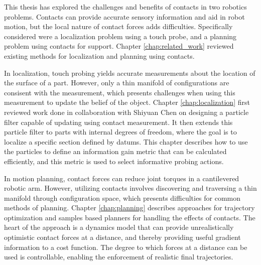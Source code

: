 \documentclass[../thesis.tex]{subfiles}
\begin{document}

This thesis has explored the challenges and benefits of contacts in two robotics problems.
Contacts can provide accurate sensory information and aid in robot motion, but the local nature of contact forces adds difficulties.
Specifically considered were a localization problem using a touch probe, and a planning problem using contacts for support.
Chapter \ref{chap:related_work} reviewed existing methods for localization and planning using contacts.

In localization, touch probing yields accurate measurements about the location of the surface of a part.
However, only a thin manifold of configurations are consisent with the measurement, which presents challenges when using this measurement to update the belief of the object.
Chapter \ref{chap:localization} first reviewed work done in collaboration with Shiyuan Chen \cite{Saund2017} on designing a particle filter capable of updating using contact measurement.
It then extends this particle filter to parts with internal degrees of freedom, where the goal is to localize a specific section defined by datums.
This chapter describes how to use the particles to define an information gain metric that can be calculated efficiently, and this metric is used to select informative probing actions.

In motion planning, contact forces can reduce joint torques in a cantilevered robotic arm.
However, utilizing contacts involves discovering and traversing a thin manifold through configuration space, which presents difficulties for common methods of planning.
Chapter \ref{chap:planning} describes approaches for trajectory optimization and samples based planners for handling the effects of contacts.
The heart of the approach is a dynamics model that can provide unrealistically optimistic contact forces at a distance, and thereby providing useful gradient information to a cost function.
The degree to which forces at a distance can be used is controllable, enabling the enforcement of realistic final trajectories.
\end{document}
